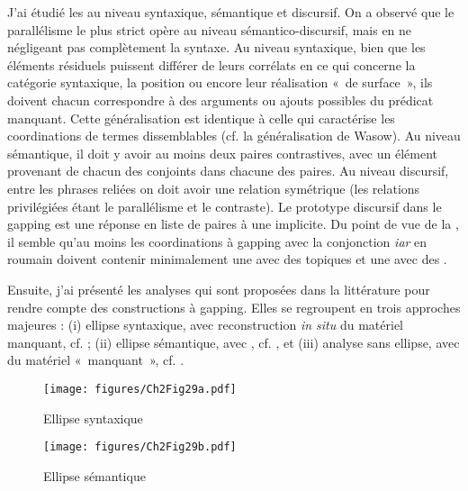 J’ai étudié les  au niveau syntaxique, sémantique et discursif. On a observé que le parallélisme le plus strict opère au niveau sémanti\-co-discursif, mais en ne négligeant pas complètement la syntaxe. Au niveau syntaxique, bien que les éléments résiduels puissent différer de leurs corrélats en ce qui concerne la catégorie syntaxique, la position ou encore leur réalisation «~de surface~», ils doivent chacun correspondre à des arguments ou ajouts possibles du prédicat manquant. Cette généralisation est identique à celle qui caractérise les coordinations de termes dissemblables (cf. la généralisation de Wasow). Au niveau sémantique, il doit y avoir au moins deux paires contrastives, avec un élément provenant de chacun des conjoints dans chacune des paires. Au niveau discursif, entre les phrases reliées on doit avoir une relation symétrique (les relations privilégiées étant le parallélisme et le contraste). Le prototype discursif dans le gapping est une réponse en liste de paires à une  implicite. Du point de vue de la , il semble qu’au moins les coordinations à gapping avec la conjonction \textit{iar} en roumain doivent contenir minimalement une  avec des topiques et une  avec des . 

Ensuite, j’ai présenté les analyses qui sont proposées dans la littérature pour ren\-dre compte des constructions à gapping. Elles se regroupent en trois appro\-ches majeures : (i) ellipse syntaxique, avec reconstruction \textit{in situ} du matériel manquant, cf.  ; (ii) ellipse sémantique, avec , cf. , et (iii) analyse sans ellipse, avec  du matériel «~manquant~», cf. .

\begin{figure}[p]
\texttt{[image: figures/Ch2Fig29a.pdf]}%
\caption{Ellipse syntaxique}
\label{ch2:fig29a}
\end{figure}

\begin{figure}[p]
\texttt{[image: figures/Ch2Fig29b.pdf]}%
\caption{Ellipse sémantique}
\label{ch2:fig29b}
\end{figure}

